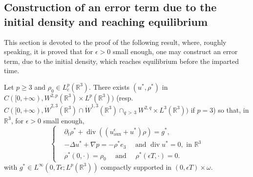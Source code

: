 \documentclass[AHL,Unicode,longabstracts,published]{cedram}
\newcommand{\aux}{\mathrm{aux}}
\newcommand{\R}{\mathbb{R}}
\renewcommand{\geq}{\geqslant}
\renewcommand{\div}{\operatorname{div}}
\newcommand{\eps}{\epsilon}
\begin{document}
\subsection{Construction of an error term due to the initial density and reaching equilibrium}

This section is devoted to the proof of the following result, where, roughly speaking, it is proved that for $\eps >0$ small enough, one may construct an error term, due to the initial density, which reaches equilibrium before the imparted time.

\begin{prop}\label{propRn}
Let $p\geq 3$ and $\rho_0 \in L^p_c(\R^3)$. There exists $(u^*, \rho^*) $ in $C([0,+\infty),W^{2,p}(\R^3) \times L^p(\R^3))$ (resp. $C([0,+\infty),\dot{W}^{2,3}(\R^3)\cap \dot{W}^{1,3}(\R^3) \cap_{q\,>\,3}W^{2,q} \times L^3(\R^3))$ if $p=3$) so that, in $\R^3$, for $\eps >0$ small enough,
\begin{equation}\label{ts*}
\left\{
\begin{array}{rcl}
&\partial_t \rho^* + \div ((u^\eps_\aux+u^*)\rho)=g^*,\\
&-\Delta u^* + \nabla p = - \rho^* e_3 \quad \text{ and } \div u^*= 0,\text{ in } \R^3\\
&\rho^*(0,\cdot)=\rho_0 \quad \text{ and } \quad \rho^*(\eps T,\cdot)=0.
\end{array}
\right.
\end{equation}
with $g^*\in L^\infty(0,T\epsilon;L^p(\R^3))$ compactly supported in $(0,\eps T)\times \omega$.
\end{prop}
\end{document}
